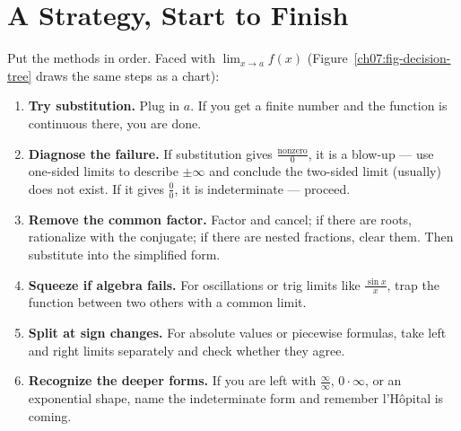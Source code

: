\section{A Strategy, Start to Finish}
\label{ch07:strategy}

Put the methods in order. Faced with $\lim_{x\to a} f(x)$
(Figure~\ref{ch07:fig-decision-tree} draws the same steps as a chart):

\begin{enumerate}
  \item \textbf{Try substitution.} Plug in $a$. If you get a finite number and
  the function is continuous there, you are done.
  \item \textbf{Diagnose the failure.} If substitution gives
  $\frac{\text{nonzero}}{0}$, it is a blow-up --- use one-sided limits to
  describe $\pm\infty$ and conclude the two-sided limit (usually) does not
  exist. If it gives $\frac00$, it is indeterminate --- proceed.
  \item \textbf{Remove the common factor.} Factor and cancel; if there are
  roots, rationalize with the conjugate; if there are nested fractions, clear
  them. Then substitute into the simplified form.
  \item \textbf{Squeeze if algebra fails.} For oscillations or trig limits like
  $\frac{\sin x}{x}$, trap the function between two others with a common limit.
  \item \textbf{Split at sign changes.} For absolute values or piecewise
  formulas, take left and right limits separately and check whether they agree.
  \item \textbf{Recognize the deeper forms.} If you are left with
  $\frac\infty\infty$, $0\cdot\infty$, or an exponential shape, name the
  indeterminate form and remember l'H\^opital is coming.
\end{enumerate}

